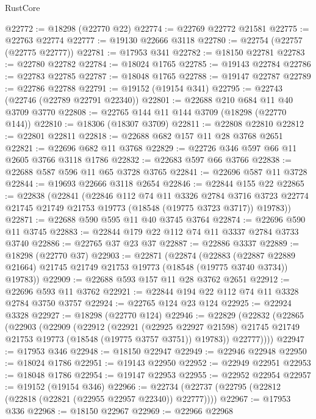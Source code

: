 \begin{lexlean}{RustCore}
\begin{coremodule}
@22772 := @18298 (@22770 @22)
@22774 := @22769 @22772 @21581
@22775 := @22763 @22774
@22777 := @19130 @22666 @3118
@22780 := @22754 (@22757 (@22775 @22777))
@22781 := @17953 @341
@22782 := @18150 @22781
@22783 := @22780 @22782
@22784 := @18024 @1765
@22785 := @19143 @22784
@22786 := @22783 @22785
@22787 := @18048 @1765
@22788 := @19147 @22787
@22789 := @22786 @22788
@22791 := @19152 (@19154 @341)
@22795 := @22743 (@22746 (@22789 @22791 @22340))
@22801 := @22688 @210 @684 @11 @40 @3709 @3770
@22808 := @22765 @144 @11 @144 @3709 (@18298 (@22770 @144))
@22810 := @18306 (@18307 @3709)
@22811 := @22808 @22810
@22812 := @22801 @22811
@22818 := @22688 @682 @157 @11 @28 @3768 @2651
@22821 := @22696 @682 @11 @3768
@22829 := @22726 @346 @597 @66 @11 @2605 @3766 @3118 @1786
@22832 := @22683 @597 @66 @3766
@22838 := @22688 @587 @596 @11 @65 @3728 @3765
@22841 := @22696 @587 @11 @3728
@22844 := @19693 @22666 @3118 @2654
@22846 := @22844 @155 @22
@22865 := @22838
    (@22841
      (@22846
        @112
        @74
        @11
        @3326
        @2784
        @3716
        @3723
        @22774
        @21745
        @21749
        @21753
        @19773
        (@18548 (@19775 @3723 @3717))
        @19783))
@22871 := @22688 @590 @595 @11 @40 @3745 @3764
@22874 := @22696 @590 @11 @3745
@22883 := @22844 @179 @22 @112 @74 @11 @3337 @2784 @3733 @3740
@22886 := @22765 @37 @23 @37
@22887 := @22886 @3337
@22889 := @18298 (@22770 @37)
@22903 := @22871
    (@22874
      (@22883
        (@22887 @22889 @21664)
        @21745
        @21749
        @21753
        @19773
        (@18548 (@19775 @3740 @3734))
        @19783))
@22909 := @22688 @593 @157 @11 @28 @3762 @2651
@22912 := @22696 @593 @11 @3762
@22921 := @22844 @194 @22 @112 @74 @11 @3328 @2784 @3750 @3757
@22924 := @22765 @124 @23 @124
@22925 := @22924 @3328
@22927 := @18298 (@22770 @124)
@22946 := @22829
    (@22832
      (@22865
        (@22903
          (@22909
            (@22912
              (@22921
                (@22925 @22927 @21598)
                @21745
                @21749
                @21753
                @19773
                (@18548 (@19775 @3757 @3751))
                @19783))
            @22777))))
@22947 := @17953 @346
@22948 := @18150 @22947
@22949 := @22946 @22948
@22950 := @18024 @1786
@22951 := @19143 @22950
@22952 := @22949 @22951
@22953 := @18048 @1786
@22954 := @19147 @22953
@22955 := @22952 @22954
@22957 := @19152 (@19154 @346)
@22966 := @22734 (@22737 (@22795 (@22812 (@22818 (@22821 (@22955 @22957 @22340)) @22777))))
@22967 := @17953 @336
@22968 := @18150 @22967
@22969 := @22966 @22968

\end{coremodule}
\end{lexlean}
